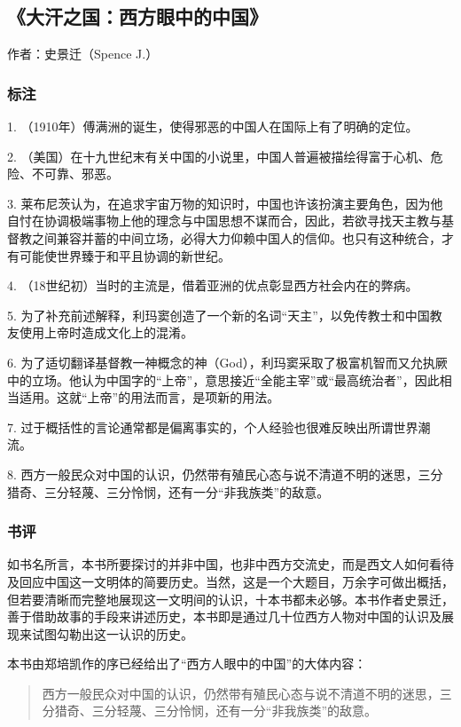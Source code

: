 \subsection{《大汗之国：西方眼中的中国》}

作者：史景迁（Spence J.）

\subsubsection{标注}
1. （1910年）傅满洲的诞生，使得邪恶的中国人在国际上有了明确的定位。

2. （美国）在十九世纪末有关中国的小说里，中国人普遍被描绘得富于心机、危险、不可靠、邪恶。

3. 莱布尼茨认为，在追求宇宙万物的知识时，中国也许该扮演主要角色，因为他自忖在协调极端事物上他的理念与中国思想不谋而合，因此，若欲寻找天主教与基督教之间兼容并蓄的中间立场，必得大力仰赖中国人的信仰。也只有这种统合，才有可能使世界臻于和平且协调的新世纪。

4. （18世纪初）当时的主流是，借着亚洲的优点彰显西方社会内在的弊病。

5. 为了补充前述解释，利玛窦创造了一个新的名词“天主”，以免传教士和中国教友使用上帝时造成文化上的混淆。

6. 为了适切翻译基督教一神概念的神（God），利玛窦采取了极富机智而又允执厥中的立场。他认为中国字的“上帝”，意思接近“全能主宰”或“最高统治者”，因此相当适用。这就“上帝”的用法而言，是项新的用法。

7. 过于概括性的言论通常都是偏离事实的，个人经验也很难反映出所谓世界潮流。

8. 西方一般民众对中国的认识，仍然带有殖民心态与说不清道不明的迷思，三分猎奇、三分轻蔑、三分怜悯，还有一分“非我族类”的敌意。

\subsubsection{书评}

如书名所言，本书所要探讨的并非中国，也非中西方交流史，而是西文人如何看待及回应中国这一文明体的简要历史。当然，这是一个大题目，万余字可做出概括，但若要清晰而完整地展现这一文明间的认识，十本书都未必够。本书作者史景迁，善于借助故事的手段来讲述历史，本书即是通过几十位西方人物对中国的认识及展现来试图勾勒出这一认识的历史。

本书由郑培凯作的序已经给出了“西方人眼中的中国”的大体内容：
\begin{quotation}
西方一般民众对中国的认识，仍然带有殖民心态与说不清道不明的迷思，三分猎奇、三分轻蔑、三分怜悯，还有一分“非我族类”的敌意。
\end{quotation}

